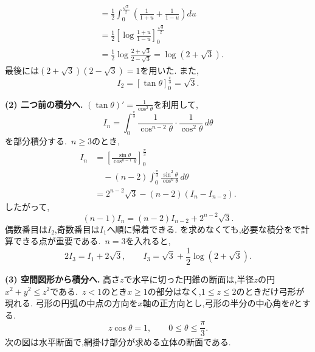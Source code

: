 \begin{enumerate}[label=\textbf{問\arabic*.},leftmargin=3.8em,format=\bookitemlink{practice-entrance}{solution}{problem}]
\[\begin{aligned}
                 &=\frac12\int_0^{\frac{\sqrt3}{2}}
                       \left(\frac1{1+u}+\frac1{1-u}\right)du\\
                 &=\frac12\left[\log\frac{1+u}{1-u}\right]_0^{\frac{\sqrt3}{2}}\\
                 &=\frac12\log\frac{2+\sqrt3}{2-\sqrt3}
                 =\log(2+\sqrt3).
                 \end{aligned}
                \]
                最後には$(2+\sqrt3)(2-\sqrt3)=1$を用いた.
                また,
                \[
                 I_2=[\tan\theta]_0^{\frac{\pi}{3}}=\sqrt3.
                \]
                \par\noindent
\textbf{(2) 二つ前の積分へ.}
                $\displaystyle (\tan\theta)'=\frac{1}{\cos^2\theta}$を利用して,
                \[
                 I_n=\int_0^{\frac{\pi}{3}}
                      \frac1{\cos^{n-2}\theta}\cdot\frac1{\cos^2\theta}\,d\theta
                \]
                を部分積分する.
                \,$n\geq3$のとき,
                \[
                 \begin{aligned}
                 I_n
                 &=\left[\frac{\sin\theta}{\cos^{n-1}\theta}\right]_0^{\frac{\pi}{3}}\\
                 &\quad -(n-2)\int_0^{\frac{\pi}{3}}
                           \frac{\sin^2\theta}{\cos^n\theta}\,d\theta\\
                 &=2^{n-2}\sqrt3-(n-2)(I_n-I_{n-2}).
                 \end{aligned}
                \]
                したがって,
                \[
                 (n-1)I_n=(n-2)I_{n-2}+2^{n-2}\sqrt3.
                \]
                偶数番目は$I_2$,奇数番目は$I_1$へ順に帰着できる.
                を求めなくても,必要な積分をで計算できる点が重要である.
                \,$n=3$を入れると,
                \[
                 2I_3=I_1+2\sqrt3,
                 \qquad
                 I_3=\sqrt3+\frac12\log(2+\sqrt3).
                \]
                \par\noindent
                \textbf{(3) 空間図形から積分へ.}
                高さ$z$で水平に切った円錐の断面は,半径$z$の円$x^2+y^2\leq z^2$である.
                \,$z<1$のとき$x\geq1$の部分はなく,$1\leq z\leq2$のときだけ弓形が現れる.
                弓形の円弧の中点の方向を$x$軸の正方向とし,弓形の半分の中心角を$\theta$とする.
                \[
                 z\cos\theta=1,\qquad 0\leq\theta\leq\frac\pi3.
                \]
                次の図は水平断面で,網掛け部分が求める立体の断面である.

\end{enumerate}
